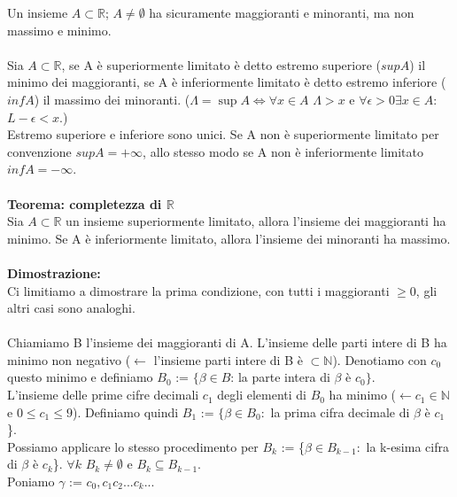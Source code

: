 \documentclass{article}
\begin{document}
Un insieme $A \subset \mathds{R}$; $A \neq \emptyset$ ha sicuramente maggioranti e minoranti, ma non massimo e minimo.\\\\
Sia $A \subset \mathds{R}$, se A è superiormente limitato è detto estremo superiore ($sup A$) il minimo dei maggioranti, se A è inferiormente limitato è detto estremo inferiore ($inf A$) il massimo dei minoranti.
($\Lambda=\sup A\Leftrightarrow\forall x\in A$ $\Lambda>x$ e $\forall\epsilon>0\exists x\in A:$ $L-\epsilon<x$.)\\
Estremo superiore e inferiore sono unici. Se A non è superiormente limitato per convenzione $sup A = +\infty$, allo stesso modo se A non è inferiormente limitato $inf A = -\infty$.\\\\
\textbf{Teorema: completezza di $\mathds{R}$}\\
Sia $A \subset \mathds{R}$ un insieme superiormente limitato, allora l'insieme dei maggioranti ha minimo. Se A è inferiormente limitato, allora l'insieme dei minoranti ha massimo.\\\\
\textbf{Dimostrazione:}\\
Ci limitiamo a dimostrare la prima condizione, con tutti i maggioranti $\geq 0$, gli altri casi sono analoghi.\\\\
Chiamiamo B l'insieme dei maggioranti di A. L'insieme delle parti intere di B ha minimo non negativo ($\leftarrow$ l'insieme parti intere di B è $\subset \mathds{N}$). Denotiamo con $c_0$ questo minimo e definiamo $B_0$ := $\{\beta \in B$: la parte intera di $\beta$ è $c_0 \}$.\\
L'insieme delle prime cifre decimali $c_1$ degli elementi di $B_0$ ha minimo ($\leftarrow c_1 \in \mathds{N}$ e $0 \leq c_1 \leq 9$). Definiamo quindi $B_1$ := $\{\beta \in B_0:$ la prima cifra decimale di $\beta$ è $c_1$\}.\\
Possiamo applicare lo stesso procedimento per $B_k$ := \{$\beta \in B_{k - 1}:$ la k-esima cifra di $\beta$ è $c_k$\}. $\forall k$ $B_k \neq \emptyset$ e $B_k \subseteq B_{k-1}$.\\
Poniamo $\gamma$ := $c_0, c_1 c_2 ... c_k ...$
\end{document}
